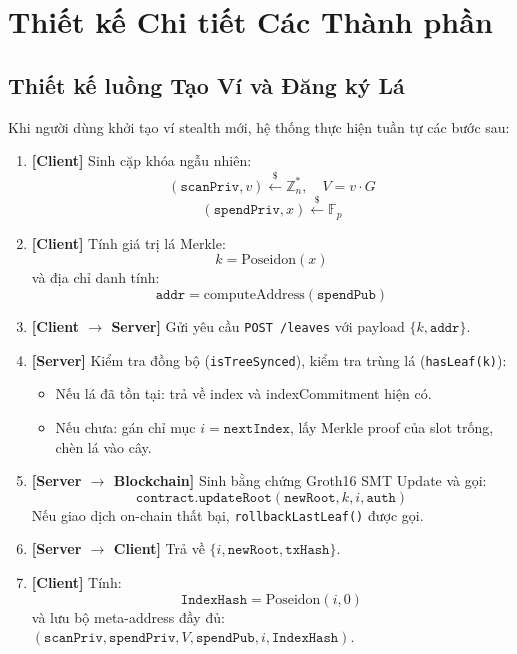 \documentclass[../DoAn.tex]{subfiles}
\begin{document}
\section{Thiết kế Chi tiết Các Thành phần}
\label{sec:detailed_design}

\subsection{Thiết kế luồng Tạo Ví và Đăng ký Lá}
\label{subsec:create_wallet_flow}

Khi người dùng khởi tạo ví stealth mới, hệ thống thực hiện tuần tự các bước sau:

\begin{enumerate}
    \item \textbf{[Client]} Sinh cặp khóa ngẫu nhiên:
    \[
        (\texttt{scanPriv}, v) \xleftarrow{\$} \mathbb{Z}_n^*, \quad V = v \cdot G
    \]
    \[
        (\texttt{spendPriv}, x) \xleftarrow{\$} \mathbb{F}_p
    \]

    \item \textbf{[Client]} Tính giá trị lá Merkle:
    \[
        k = \text{Poseidon}(x)
    \]
    và địa chỉ danh tính:
    \[
        \texttt{addr} = \text{computeAddress}(\texttt{spendPub})
    \]

    \item \textbf{[Client $\to$ Server]} Gửi yêu cầu \texttt{POST /leaves} với payload \(\{k, \texttt{addr}\}\).

    \item \textbf{[Server]} Kiểm tra đồng bộ (\texttt{isTreeSynced}), kiểm tra trùng lá (\texttt{hasLeaf(k)}):
    \begin{itemize}
        \item Nếu lá đã tồn tại: trả về index và indexCommitment hiện có.
        \item Nếu chưa: gán chỉ mục \(i = \texttt{nextIndex}\), lấy Merkle proof của slot trống, chèn lá vào cây.
    \end{itemize}

    \item \textbf{[Server $\to$ Blockchain]} Sinh bằng chứng Groth16 SMT Update và gọi:
    \[
        \texttt{contract.updateRoot}(\texttt{newRoot}, k, i, \texttt{auth})
    \]
    Nếu giao dịch on-chain thất bại, \texttt{rollbackLastLeaf()} được gọi.

    \item \textbf{[Server $\to$ Client]} Trả về \(\{i, \texttt{newRoot}, \texttt{txHash}\}\).

    \item \textbf{[Client]} Tính:
    \[
        \texttt{IndexHash} = \text{Poseidon}(i, 0)
    \]
    và lưu bộ meta-address đầy đủ: \((\texttt{scanPriv}, \texttt{spendPriv}, V, \texttt{spendPub}, i, \texttt{IndexHash})\).
\end{enumerate}
\end{document}
